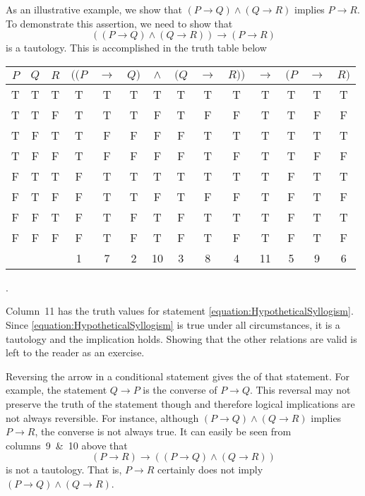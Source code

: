 As an illustrative example, we show that $(P \rightarrow Q) \wedge (Q \rightarrow R)$ implies $P \rightarrow R$.
To demonstrate this assertion, we need to show that
\begin{equation} \label{equation:HypotheticalSyllogism}
((P \rightarrow Q) \wedge (Q \rightarrow R)) \rightarrow (P \rightarrow R)
\end{equation}
is a tautology.
This is accomplished in the truth table below
\begin{center}
\begin{tabular}{|c|c|c|c:c:c:c:c:c:c:c:c:c:c|}
\hline
$P$ & $Q$ & $R$
& $((P$ & $\rightarrow$ & $Q)$ & $\wedge$ & $(Q$ & $\rightarrow$ & $R))$ & $\rightarrow$ & $(P$ & $\rightarrow$ & $R)$ \tabularnewline
\hline
T & T & T & T & T & T & T & T & T & T & T & T & T & T \tabularnewline
T & T & F & T & T & T & F & T & F & F & T & T & F & F \tabularnewline
T & F & T & T & F & F & F & F & T & T & T & T & T & T \tabularnewline
T & F & F & T & F & F & F & F & T & F & T & T & F & F \tabularnewline
F & T & T & F & T & T & T & T & T & T & T & F & T & T \tabularnewline
F & T & F & F & T & T & F & T & F & F & T & F & T & F \tabularnewline
F & F & T & F & T & F & T & F & T & T & T & F & T & T \tabularnewline
F & F & F & F & T & F & T & F & T & F & T & F & T & F \tabularnewline
& & & 1 & 7 & 2 & 10 & 3 & 8 & 4 & 11 & 5 & 9 & 6 \tabularnewline
\hline
\end{tabular} .
\end{center}
Column~11 has the truth values for statement \eqref{equation:HypotheticalSyllogism}.
Since \eqref{equation:HypotheticalSyllogism} is true under all circumstances, it is a tautology and the implication holds.
Showing that the other relations are valid is left to the reader as an exercise.

Reversing the arrow in a conditional statement gives the  of that statement.
For example, the statement $Q \rightarrow P$ is the converse of $P \rightarrow Q$.
This reversal may not preserve the truth of the statement though and therefore logical implications are not always reversible.
For instance, although $(P \rightarrow Q) \wedge (Q \rightarrow R)$ implies $P \rightarrow R$, the converse is not always true.
It can easily be seen from columns~9~\&~10 above that
\begin{equation*}
(P \rightarrow R) \rightarrow ((P \rightarrow Q) \wedge (Q \rightarrow R))
\end{equation*}
is not a tautology.
That is, $P \rightarrow R$ certainly does not imply $(P \rightarrow Q) \wedge (Q \rightarrow R)$.

